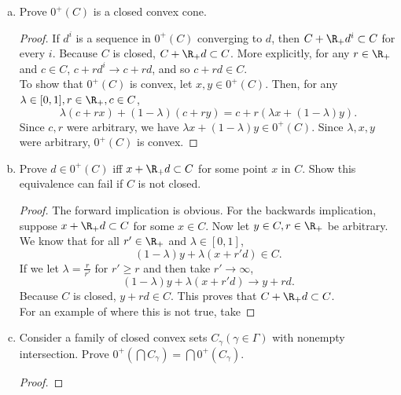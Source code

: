 \documentclass[12pt, letterpaper]{article}
\numberwithin{equation}{subsection}
\begin{document}
\begin{enumerate}[(a)]
\item Prove $0^+(C)$ is a closed convex cone.
\begin{proof}
If $d^i$ is a sequence in $0^+(C)$ converging to $d$, then 
$C+\R_+d^i\subset C$ for every $i$. Because $C$ is closed, 
$C+\R_+d\subset C$. More explicitly, for any $r\in\R_+$ and $c\in C$, 
$c+rd^i\to c+rd$, and so $c+rd\in C$. \\
To show that $0^+(C)$ is convex, let $x,y\in 0^+(C)$. Then, for any 
$\lambda\in[0,1], r\in\R_+, c\in C$,
\begin{equation*}
\lambda (c+rx) + (1-\lambda)(c+ry) = c+r(\lambda x + (1-\lambda)y).
\end{equation*}
Since $c,r$ were arbitrary, we have $\lambda x+(1-\lambda)y\in 0^+(C)$. 
Since $\lambda,x,y$ were arbitrary, $0^+(C)$ is convex.
\end{proof}
\item Prove $d\in0^+(C)$ iff $x+\R_+d\subset C$ for some point $x$ in 
$C$. Show this equivalence can fail if $C$ is not closed. 
\begin{proof}
The forward implication is obvious. For the backwards implication, 
suppose $x+\R_+d\subset C$ for some $x\in C$. Now let $y\in C, 
r\in\R_+$ be arbitrary. We know that for all $r'\in\R_+$ and $\lambda
\in[0,1]$,
\begin{equation*}
(1-\lambda)y + \lambda(x+r'd) \in C.
\end{equation*}
If we let $\lambda = \frac{r}{r'}$ for $r'\geq r$
 and then take $r'\to\infty$, 
\begin{equation*}
(1-\lambda)y + \lambda(x+r'd) \to y + rd.
\end{equation*}
Because $C$ is closed, $y+rd \in C$. This proves that $C+\R_+d\subset C$.\\
For an example of where this is not true, take\par
{}
\end{proof}
\item Consider a family of closed convex sets $C_{\gamma}(\gamma\in\Gamma)$
with nonempty intersection. Prove $0^+(\bigcap C_\gamma) = \bigcap 
0^+(C_\gamma)$.
\begin{proof}

\end{proof}
\end{enumerate}
\end{document}
